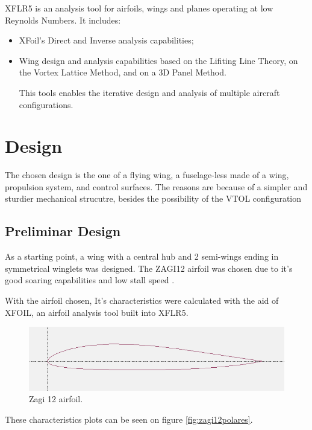 XFLR5 is an analysis tool for airfoils, wings and planes operating at low Reynolds Numbers. It includes:
\begin{itemize}

\item XFoil's Direct and Inverse analysis capabilities;
\item Wing design and analysis capabilities based on the Lifiting Line Theory, on the Vortex Lattice Method, and on a 3D Panel Method.

This tools enables the iterative design and analysis of multiple aircraft configurations.


\end{itemize}


\section{Design}

The chosen design is the one of a flying wing, a fuselage-less made of a wing, propulsion system, and control surfaces. The reasons are because of a simpler and sturdier mechanical strucutre, besides the possibility of the VTOL configuration

\subsection{Preliminar Design}

As a starting point, a wing with a central hub and 2 semi-wings ending in symmetrical winglets was designed. The ZAGI12 airfoil was chosen due to it's good soaring capabilities and low stall speed .

With the airfoil chosen, It's characteristics were calculated with the aid of XFOIL, an airfoil analysis tool built into XFLR5.

\begin{figure}
\centering
  \includegraphics[width=\linewidth]{figs/zagi12.png}
  \caption{Zagi 12 airfoil.}
  \label{fig:zagi12}
\end{figure}


These characteristics plots can be seen on figure \ref{fig:zagi12polares}.
%

